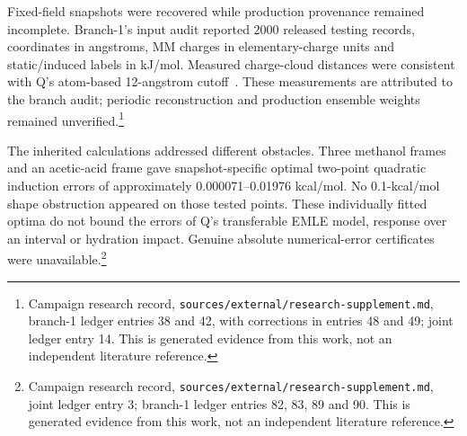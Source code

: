\documentclass{article}
\newcommand{\record}[1]{\footnote{Campaign research record, \texttt{sources/external/research-supplement.md}, #1. This is generated evidence from this work, not an independent literature reference.}}
\begin{document}
Fixed-field snapshots were recovered while production provenance remained incomplete. Branch-1's input audit reported 2000 released testing records, coordinates in angstroms, MM charges in elementary-charge units and static/induced labels in kJ/mol. Measured charge-cloud distances were consistent with Q's atom-based 12-angstrom cutoff~\cite{Q}. These measurements are attributed to the branch audit; periodic reconstruction and production ensemble weights remained unverified.\record{branch-1 ledger entries 38 and 42, with corrections in entries 48 and 49; joint ledger entry 14}

The inherited calculations addressed different obstacles. Three methanol frames and an acetic-acid frame gave snapshot-specific optimal two-point quadratic induction errors of approximately 0.000071--0.01976 kcal/mol. No 0.1-kcal/mol shape obstruction appeared on those tested points. These individually fitted optima do not bound the errors of Q's transferable EMLE model, response over an interval or hydration impact. Genuine absolute numerical-error certificates were unavailable.\record{joint ledger entry 3; branch-1 ledger entries 82, 83, 89 and 90}
\end{document}
